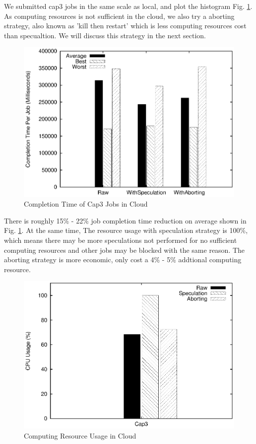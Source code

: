 We submitted cap3 jobs in the same scale as local, and plot the histogram Fig. \ref{figure:completiontime_cap3_cloud}. As computing resources is not sufficient in the cloud, we also try a aborting strategy, also known as 'kill then restart' which is less computing resources cost than specualtion. We will discuss this strategy in the next section.

\begin{figure}
\centering
\includegraphics[width=0.9\columnwidth]{figures/cloud_completiontime_cap3.eps}
\caption{Completion Time of Cap3 Jobs in Cloud}
\label{figure:completiontime_cap3_cloud}
\end{figure}

There is roughly 15\% - 22\% job completion time reduction on average shown in Fig. \ref{figure:completiontime_cap3_cloud}. At the same time, The resource usage with speculation strategy is 100\%, which means there may be more speculations not performed for no sufficient computing resources and other jobs may be blocked with the same reason. The aborting strategy is more economic, only cost a 4\% - 5\% addtional computing resource.

\begin{figure}
\centering
\includegraphics[width=0.9\columnwidth]{figures/cloud_resource_usage.eps}
\caption{Computing Resource Usage in Cloud}
\label{figure:resourceusage_cloud}
\end{figure}

